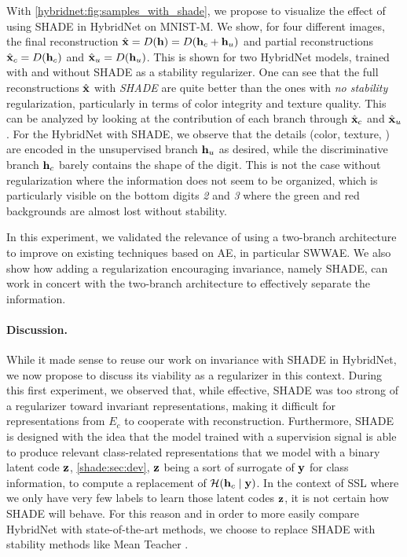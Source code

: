 With \autoref{hybridnet:fig:samples_with_shade}, we propose to visualize the effect of using \ac{SHADE} in HybridNet on MNIST-M. We show, for four different images, the final reconstruction $\hat{\mathbf{x}} = D(\mathbf{h}) = D(\mathbf{h}_c + \mathbf{h}_u)$ and partial reconstructions $\hat{\mathbf{x}}_c = D(\mathbf{h}_c)$ and $\hat{\mathbf{x}}_u = D(\mathbf{h}_u)$. This is shown for two HybridNet models, trained with and without \ac{SHADE} as a stability regularizer.
One can see that the full reconstructions $\hat{\mathbf{x}}$ with \textit{\ac{SHADE}} are quite better than the ones with \textit{no stability} regularization, particularly in terms of color integrity and texture quality. This can be analyzed by looking at the contribution of each branch through $\hat{\mathbf{x}}_c$ and $\hat{\mathbf{x}}_u$. For the HybridNet with \ac{SHADE}, we observe that the details (color, texture, \etc) are encoded in the unsupervised branch $\mathbf{h}_u$ as desired, while the discriminative branch $\mathbf{h}_c$ barely contains the shape of the digit. This is not the case without regularization where the information does not seem to be organized, which is particularly visible on the bottom digits \textit{2} and \textit{3} where the green and red backgrounds are almost lost without stability.

In this experiment, we validated the relevance of using a two-branch architecture to improve on existing techniques based on \ac{AE}, in particular \ac{SWWAE}. We also show how adding a regularization encouraging invariance, namely \ac{SHADE}, can work in concert with the two-branch architecture to effectively separate the information.

\paragraph{Discussion.} While it made sense to reuse our work on invariance with \ac{SHADE} in HybridNet, we now propose to discuss its viability as a regularizer in this context. During this first experiment, we observed that, while effective, \ac{SHADE} was too strong of a regularizer toward invariant representations, making it difficult for representations from $E_c$ to cooperate with reconstruction. Furthermore, \ac{SHADE} is designed with the idea that the model trained with a supervision signal is able to produce relevant class-related representations that we model with a binary latent code $\mathbf{z}$, \cf \autoref{shade:sec:dev}, $\mathbf{z}$ being a sort of surrogate of $\mathbf{y}$ for class information, to compute a replacement of $\mathcal{H}(\mathbf{h}_c \mid \mathbf{y})$. In the context of \ac{SSL} where we only have very few labels to learn those latent codes $\mathbf{z}$, it is not certain how \ac{SHADE} will behave. For this reason and in order to more easily compare HybridNet with state-of-the-art methods, we choose to replace \ac{SHADE} with stability methods like Mean Teacher \citep{Tarvainen2017}.

